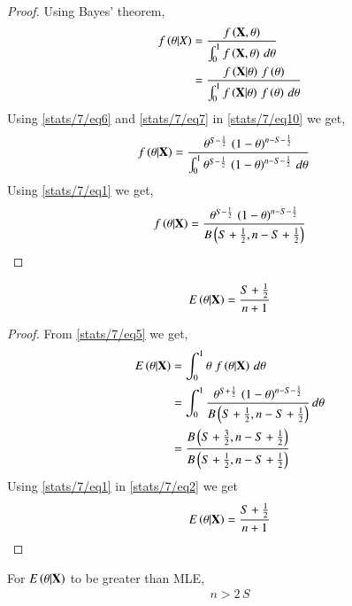     \begin{proof}
    Using Bayes' theorem, 
    \begin{align}
        f\left(\theta|X\right) &= \frac{f\left(\mathbf{X},\theta\right)}{\int_0^1 f\left(\mathbf{X},\theta\right)\,d\theta} \nonumber\\
        &= \frac{f\left(\mathbf{X}|\theta\right)\, f\left(\theta\right)}{\int_0^1 f\left(\mathbf{X}|\theta\right)\, f\left(\theta\right)\,d\theta}\label{stats/7/eq10}
    \end{align}
    Using \eqref{stats/7/eq6} and \eqref{stats/7/eq7} in \eqref{stats/7/eq10} we get,
    \begin{align}
        f\left(\theta|\mathbf{X}\right) &= \frac{\theta^{S-\frac{1}{2}}\,\left(1-\theta\right)^{n-S-\frac{1}{2}}}{\int_0^1 \theta^{S-\frac{1}{2}}\,\left(1-\theta\right)^{n-S-\frac{1}{2}}\,d\theta}
    \end{align}
    Using \eqref{stats/7/eq1} we get,
    \begin{align}
        f\left(\theta|\mathbf{X}\right) = \frac{\theta^{S-\frac{1}{2}}\,\left(1-\theta\right)^{n-S-\frac{1}{2}}}{B\left(S+\frac{1}{2},n-S+\frac{1}{2}\right)}
    \end{align}
    \end{proof}
    \begin{corollary}
    \begin{align}
        E\left(\theta|\mathbf{X}\right) = \frac{S+\frac{1}{2}}{n+1}\label{stats/7/eq3}
    \end{align}
    \end{corollary}
    \begin{proof}
    From \eqref{stats/7/eq5} we get,
    \begin{align}
        E\left(\theta|\mathbf{X}\right) &= \int_0^1 \theta\;f\left(\theta|\mathbf{X}\right)\,d\theta\nonumber\\
        &=\int_0^1 \frac{\theta^{S+\frac{1}{2}}\,\left(1-\theta\right)^{n-S-\frac{1}{2}}}{B\left(S+\frac{1}{2},n-S+\frac{1}{2}\right)}\,d\theta\nonumber\\
        &=\frac{B\left(S+\frac{3}{2},n-S+\frac{1}{2}\right)}{B\left(S+\frac{1}{2},n-S+\frac{1}{2}\right)}\label{stats/7/eq2}
    \end{align}
    Using \eqref{stats/7/eq1} in \eqref{stats/7/eq2} we get
    \begin{align}
        E\left(\theta|\mathbf{X}\right) = \frac{S+\frac{1}{2}}{n+1}
    \end{align}
    \end{proof}
    \begin{corollary}
    For $E\left(\theta|\mathbf{X}\right)$ to be greater than MLE,
    \begin{align}
        n>2\,S\label{stats/7/eq4}
    \end{align}
    \end{corollary}
